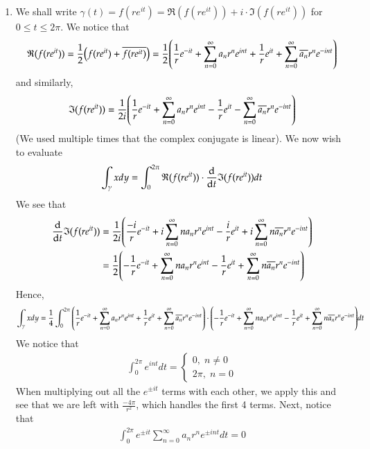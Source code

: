 \documentclass[12pt]{article}
\theoremstyle{definitionstyle}
\renewcommand{\Re}{\mathfrak{R}}
\renewcommand{\Im}{\mathfrak{I}}
\begin{document}
\begin{enumerate}[leftmargin=\labelsep]
		\item We shall write $\gamma(t) = f(re^{it}) = \Re(f(re^{it})) + i \cdot \Im(f(re^{it}))$ for $0 \leq t \leq 2\pi$. We notice that
		\begin{align*}
			\Re(f(re^{it})) = \frac12\qty(f(re^{it}) + \overline{f(re^{it})}) =  \frac12 \qty(\frac1r e^{-it} + \sum_{n=0}^\infty a_n r^n e^{int} + \frac1r e^{it} + \sum_{n=0}^\infty \overline{a_n} r^n e^{-int})
		\end{align*}
		and similarly,
		\begin{align*}
			\Im(f(re^{it})) = \frac1{2i} \qty(\frac1r e^{-it} + \sum_{n=0}^\infty a_n r^n e^{int} - \frac1r e^{it} - \sum_{n=0}^\infty \overline{a_n} r^n e^{-int})
		\end{align*}
		(We used multiple times that the complex conjugate is linear). We now wish to evaluate
		\begin{align*}
			\int_{\gamma} xdy = \int_0^{2\pi} \Re(f(re^{it})) \cdot \dv{t} \Im(f(re^{it}))dt
		\end{align*}
		We see that
		\begin{align*}
			\dv{t} \Im(f(re^{it})) &= \frac{1}{2i}\qty(\frac{-i}{r}e^{-it} + i\sum_{n=0}^\infty na_nr^ne^{int} - \frac{i}{r}e^{it} + i\sum_{n=0}^\infty n\overline{a_n}r^n e^{-int}) \\&= \frac12\qty(-\frac{1}{r}e^{-it} + \sum_{n=0}^\infty na_nr^ne^{int} - \frac{1}{r}e^{it} + \sum_{n=0}^\infty n\overline{a_n}r^n e^{-int})
		\end{align*}
		Hence,
		\begin{align*}
			\int_{\gamma} xdy = \frac14\int_0^{2\pi} \qty(\frac1r e^{-it} + \sum_{n=0}^\infty a_n r^n e^{int} + \frac1r e^{it} + \sum_{n=0}^\infty \overline{a_n} r^n e^{-int}) \cdot \qty(-\frac{1}{r}e^{-it} + \sum_{n=0}^\infty na_nr^ne^{int} - \frac{1}{r}e^{it} + \sum_{n=0}^\infty n\overline{a_n}r^n e^{-int})dt
		\end{align*}
		We notice that 
		\begin{align*}
			\int_0^{2\pi} e^{int}dt = \begin{cases}
				0, \; n \neq 0 \\
				2\pi, \; n = 0
			\end{cases}
		\end{align*}
		When multiplying out all the $e^{\pm it}$ terms with each other, we apply this and see that we are left with $\frac{-4\pi}{r^2}$, which handles the first 4 terms. Next, notice that 
		\begin{align*}
			\int_0^{2\pi} e^{\pm it} \sum_{n=0}^{\infty} a_nr^ne^{\pm int}dt = 0

\end{align*}
\end{enumerate}
\end{document}
